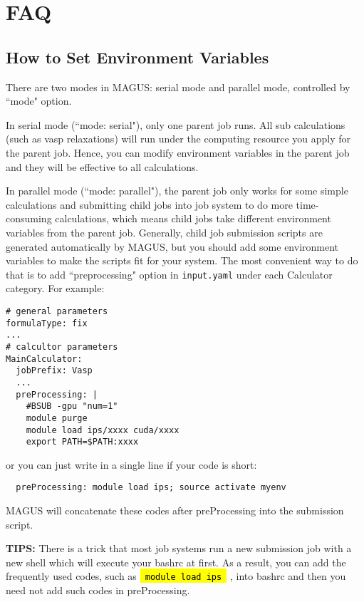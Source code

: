 \documentclass[12pt,oneside]{book}
\newcommand{\code}[1]{
  \begingroup
  \sethlcolor{Seashell}
  {\hl{\texttt{~#1~}}}
  \endgroup
}
\newcommand{\file}[1]{\texttt{#1}}
\begin{document}
\chapter{FAQ}
\section{How to Set Environment Variables}\label{sec: preprocessing}
There are two modes in MAGUS: serial mode and parallel mode, controlled by ``mode" option.

In serial mode (``mode: serial"), only one parent job runs. All sub calculations (such as vasp relaxations) will run under the computing resource you apply for the parent job. Hence, you can modify environment variables in the parent job and they will be effective to all calculations.

In parallel mode (``mode: parallel"), the parent job only works for some simple calculations and submitting child jobs into job system to do more time-consuming calculations, which means child jobs take different environment variables from the parent job. Generally, child job submission scripts are generated automatically by MAGUS, but you should add some environment variables to make the scripts fit for your system. The most convenient way to do that is to add ``preprocessing" option in \file{input.yaml} under each Calculator category. For example:
\begin{tcolorbox}
    \begin{verbatim}
# general parameters
formulaType: fix
...
# calcultor parameters
MainCalculator:
  jobPrefix: Vasp
  ...
  preProcessing: |
    #BSUB -gpu "num=1"
    module purge
    module load ips/xxxx cuda/xxxx
    export PATH=$PATH:xxxx
    \end{verbatim}
\end{tcolorbox}
or you can just write in a single line if your code is short:
\begin{tcolorbox}
    \begin{verbatim}
  preProcessing: module load ips; source activate myenv
    \end{verbatim}
\end{tcolorbox}
MAGUS will concatenate these codes after preProcessing into the submission script.

\textbf{TIPS:} There is a trick that most job systems run a new submission job with a new shell which will execute your bashrc at first. As a result, you can add the frequently used codes, such as \code{module load ips}, into bashrc and then you need not add such codes in preProcessing.
\end{document}

